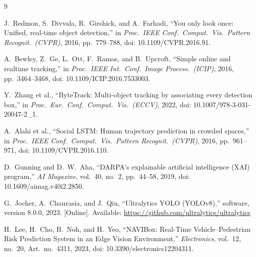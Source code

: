 \documentclass[12pt,a4paper]{report}
\begin{document}
\begin{thebibliography}{9}

J.\ Redmon, S.\ Divvala, R.\ Girshick, and A.\ Farhadi, ``You only look once: Unified, real-time object detection,'' in \textit{Proc.\ IEEE Conf.\ Comput.\ Vis.\ Pattern Recognit.\ (CVPR)}, 2016, pp.\ 779--788, doi: 10.1109/CVPR.2016.91.

A.\ Bewley, Z.\ Ge, L.\ Ott, F.\ Ramos, and B.\ Upcroft, ``Simple online and realtime tracking,'' in \textit{Proc.\ IEEE Int.\ Conf.\ Image Process.\ (ICIP)}, 2016, pp.\ 3464--3468, doi: 10.1109/ICIP.2016.7533003.

Y.\ Zhang et al., ``ByteTrack: Multi-object tracking by associating every detection box,'' in \textit{Proc.\ Eur.\ Conf.\ Comput.\ Vis.\ (ECCV)}, 2022, doi: 10.1007/978-3-031-20047-2\_1.

A.\ Alahi et al., ``Social LSTM: Human trajectory prediction in crowded spaces,'' in \textit{Proc.\ IEEE Conf.\ Comput.\ Vis.\ Pattern Recognit.\ (CVPR)}, 2016, pp.\ 961--971, doi: 10.1109/CVPR.2016.110.

D.\ Gunning and D.\ W.\ Aha, ``DARPA's explainable artificial intelligence (XAI) program,'' \textit{AI Magazine}, vol.\ 40, no.\ 2, pp.\ 44--58, 2019, doi: 10.1609/aimag.v40i2.2850.

G.\ Jocher, A.\ Chaurasia, and J.\ Qiu, ``Ultralytics YOLO (YOLOv8),'' software, version 8.0.0, 2023. [Online]. Available: \url{https://github.com/ultralytics/ultralytics}

H.\ Lee, H.\ Cho, B.\ Noh, and H.\ Yeo, ``NAVIBox: Real-Time Vehicle--Pedestrian Risk Prediction System in an Edge Vision Environment,'' \textit{Electronics}, vol.\ 12, no.\ 20, Art.\ no.\ 4311, 2023, doi: 10.3390/electronics12204311.

\end{thebibliography}
\end{document}
